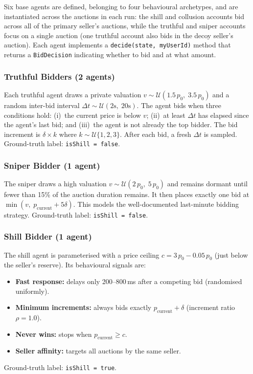 \documentclass[11pt]{article}
\begin{document}
Six base agents are defined, belonging to four behavioural archetypes,
and are instantiated across the auctions in each run: the shill and
collusion accounts bid across all of the primary seller's auctions, while
the truthful and sniper accounts focus on a single auction (one truthful
account also bids in the decoy seller's auction). Each agent implements a
\texttt{decide(state, myUserId)} method that returns a \texttt{BidDecision}
indicating whether to bid and at what amount.

\subsubsection{Truthful Bidders (2 agents)}
Each truthful agent draws a private valuation
$v \sim \mathcal{U}(1.5\,p_0,\; 3.5\,p_0)$ and a random inter-bid
interval $\Delta t \sim \mathcal{U}(2\text{s},\; 20\text{s})$.
The agent bids when three conditions hold: (i)~the current price is
below $v$; (ii)~at least $\Delta t$ has elapsed since the agent's last
bid; and (iii)~the agent is not already the top bidder. The bid increment
is $\delta \times k$ where $k \sim \mathcal{U}\{1, 2, 3\}$.
After each bid, a fresh $\Delta t$ is sampled. Ground-truth label:
\texttt{isShill = false}.

\subsubsection{Sniper Bidder (1 agent)}
The sniper draws a high valuation $v \sim \mathcal{U}(2\,p_0,\; 5\,p_0)$
and remains dormant until fewer than 15\% of the auction duration remains.
It then places exactly one bid at
$\min(v,\; p_{\text{current}} + 5\delta)$. This models the well-documented
last-minute bidding strategy. Ground-truth label: \texttt{isShill = false}.

\subsubsection{Shill Bidder (1 agent)}
The shill agent is parameterised with a price ceiling
$c = 3\,p_0 - 0.05\,p_0$ (just below the seller's reserve). Its
behavioural signals are:
\begin{itemize}
    \item \textbf{Fast response:} delays only 200--800\,ms after a
      competing bid (randomised uniformly).
    \item \textbf{Minimum increments:} always bids exactly
      $p_{\text{current}} + \delta$ (increment ratio $\rho = 1.0$).
    \item \textbf{Never wins:} stops when $p_{\text{current}} \geq c$.
    \item \textbf{Seller affinity:} targets all auctions by the same seller.
\end{itemize}
Ground-truth label: \texttt{isShill = true}.
\end{document}

